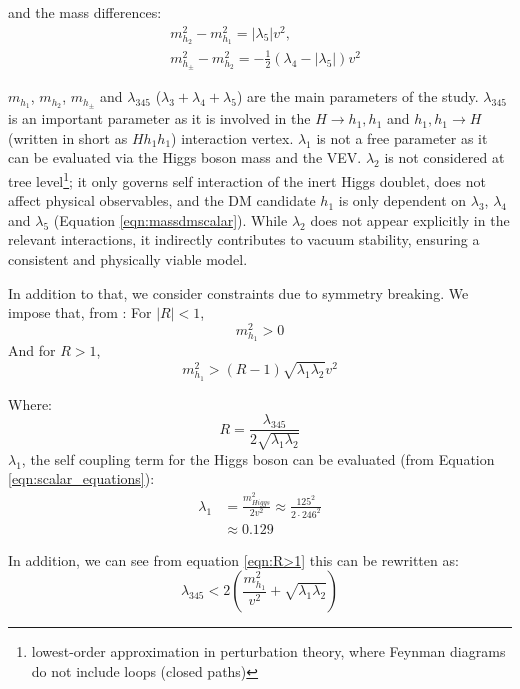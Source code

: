 \documentclass[12pt]{article}
\begin{document}
and the mass differences: 
\begin{align}
    &m_{h_2}^2 - m_{h_1}^2 =  |\lambda_5|v^2, \\
    &m_{h_\pm}^2 - m_{h_2}^2 = -\frac{1}{2}(\lambda_4 - |\lambda_5|)v^2
\end{align}

$m_{h_1}$, $m_{h_2}$, $m_{h_\pm}$ and $\lambda_{345}$ ($\lambda_3 + \lambda_4 + \lambda_5$) are the main parameters of the study. $\lambda_{345}$ is an important parameter as it is involved in the $H\rightarrow h_1,h_1$ and $h_1,h_1 \rightarrow H$ (written in short as $Hh_1h_1$) interaction vertex. $\lambda_1$ is not a free parameter as it can be evaluated via the Higgs boson mass and the VEV. $\lambda_2$ is not considered at tree level\footnote{lowest-order approximation in perturbation theory, where Feynman diagrams do not include loops (closed paths)}; it only governs self interaction of the inert Higgs doublet, does not affect physical observables, and the DM candidate $h_1$ is only dependent on $\lambda_3$, $\lambda_4$ and $\lambda_5$ (Equation \ref{eqn:massdmscalar}). While $\lambda_2$ does not appear explicitly in the relevant interactions, it indirectly contributes to vacuum stability, ensuring a consistent and physically viable model.

In addition to that, we consider constraints due to symmetry breaking. We impose that, from \cite{Belyaev:2016lok, Ginzburg2010}:
For $|R| < 1$,
\begin{equation}
    m_{h_1}^2 > 0
\end{equation}
And for $R>1$, 
\begin{equation}
    \label{eqn:R>1}
    m_{h_1}^2 > (R-1) \sqrt{\lambda_1\lambda_2} v^2
\end{equation}

Where:
\begin{equation}
    R = \frac{\lambda_{345}}{2\sqrt{\lambda_1\lambda_2}}
\end{equation}
$\lambda_1$, the self coupling term for the Higgs boson can be evaluated (from Equation \ref{eqn:scalar_equations}):
\begin{equation}
    \begin{split}
        \lambda_1 &= \frac{m^2_{Higgs}}{2 v^2}
                \approx\frac{125^2}{2\cdot 246 ^ 2} \\
                &\approx0.129
    \end{split}
\end{equation}

In addition, we can see from equation \ref{eqn:R>1} this can be rewritten as:
\begin{equation}
    \lambda_{345} < 2\left( \frac{m_{h_1}^2}{v^2} + \sqrt{\lambda_1\lambda_2}\right)
\end{equation}
\end{document}
